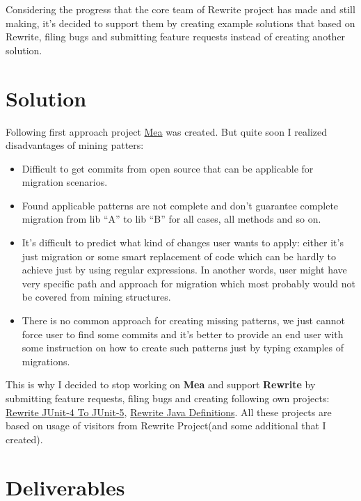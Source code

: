 \documentclass[sigplan,screen,11pt]{acmart}
\begin{document}
Considering the progress that the core team of Rewrite project has made and still making, it's decided to support them by creating example solutions that based on Rewrite, filing bugs and submitting feature requests instead of creating another solution.

\section{Solution}

Following first approach project \href{https://github.com/guseyn/Mea}{Mea} was created. But quite soon I realized disadvantages of mining patters:

\begin{itemize}
  \item Difficult to get commits from open source that can be applicable for migration scenarios.
  \item Found applicable patterns are not complete and don’t guarantee complete migration from lib “A” to lib “B” for all cases, all methods and so on.
  \item It’s difficult to predict what kind of changes user wants to apply: either it’s just migration or some smart replacement of code which can be hardly to achieve just by using regular expressions. In another words, user might have very specific path and approach for migration which most probably would not be covered from mining structures.
  \item There is no common approach for creating missing patterns, we just cannot force user to find some commits and it’s better to provide an end user with some instruction on how to create such patterns just by typing examples of migrations.
\end{itemize}

This is why I decided to stop working on \textbf{Mea} and support \textbf{Rewrite} by submitting feature requests, filing bugs and  creating following own projects: \href{https://github.com/guseyn/rewrite-junit4-to-junit5}{Rewrite JUnit-4 To JUnit-5}, \href{https://github.com/Guseyn/rewrite-java-definitions}{Rewrite Java Definitions}. All these projects are based on usage of visitors from Rewrite Project(and some additional that I created).

\section{Deliverables}
\end{document}
